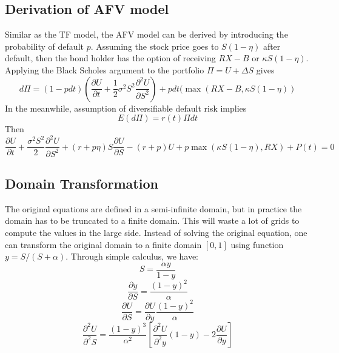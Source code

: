 \documentclass[12pt]{article}
\begin{document}
\subsection{Derivation of AFV model}
Similar as the TF model, the AFV model can be derived by introducing the probability of default $p$. Assuming the stock price goes to $S(1-\eta)$ after default, then the bond holder has the option of receiving $RX-B$ or $\kappa S(1-\eta)$. Applying the Black Scholes argument to the portfolio $\Pi = U + \Delta S$ gives
\begin{equation*}
d\Pi = (1-pdt)(\frac{\partial U}{\partial t} + \frac{1}{2}\sigma^2S^2\frac{\partial^2U}{\partial S^2}) + pdt(\max(RX - B, \kappa S(1-\eta))
\end{equation*}
In the meanwhile, assumption of diversifiable default risk implies
\begin{equation*}
E(d\Pi) = r(t)\Pi dt
\end{equation*}
Then
\begin{equation*}
\frac{\partial{U}}{\partial{t}} + 
\frac{\sigma^2S^2}{2}\frac{\partial^2{U}}{\partial{S}^2} + (r + p\eta)S\frac{\partial{U}}{\partial{S}} - (r+p)U + p\max(\kappa S(1-\eta), RX) + P(t) = 0 
\end{equation*}

\subsection{Domain Transformation}
The original equations are defined in a semi-infinite domain, but in practice the domain has to be truncated to a finite domain. This will waste a lot of grids to compute the values in the large side. Instead of solving the original equation, one can transform the original domain to a finite domain $[0, 1]$ using function $y = S/(S+\alpha)$. Through simple calculus, we have:
\begin{equation*}
S = \frac{\alpha y}{1 - y}
\end{equation*}
\begin{equation*}
\frac{\partial y}{\partial S} = \frac{(1-y)^2}{\alpha}
\end{equation*}
\begin{equation*}
\frac{\partial U}{\partial S} = \frac{\partial U}{\partial y}\frac{(1-y)^2}{\alpha}
\end{equation*}
\begin{equation*}
\frac{\partial^2U}{\partial^2 S} = \frac{(1-y)^3}{\alpha^2}[\frac{\partial^2U}{\partial^2y}(1-y) - 2\frac{\partial U}{\partial y}]
\end{equation*}
\end{document}
